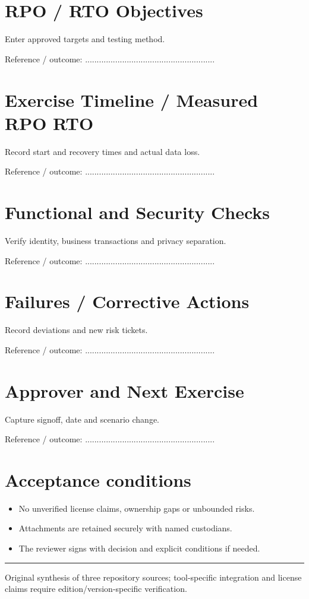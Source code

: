 \documentclass[10pt,letterpaper]{article}
\begin{document}
\section{RPO / RTO Objectives}
Enter approved targets and testing method.\par
Reference / outcome: ........................................................\par
\section{Exercise Timeline / Measured RPO RTO}
Record start and recovery times and actual data loss.\par
Reference / outcome: ........................................................\par
\section{Functional and Security Checks}
Verify identity, business transactions and privacy separation.\par
Reference / outcome: ........................................................\par
\section{Failures / Corrective Actions}
Record deviations and new risk tickets.\par
Reference / outcome: ........................................................\par
\section{Approver and Next Exercise}
Capture signoff, date and scenario change.\par
Reference / outcome: ........................................................\par
\section{Acceptance conditions}
\begin{itemize}
\item No unverified license claims, ownership gaps or unbounded risks.
\item Attachments are retained securely with named custodians.
\item The reviewer signs with decision and explicit conditions if needed.
\end{itemize}
\vfill\noindent\color{muted}\rule{\linewidth}{0.4pt}\par\scriptsize Original synthesis of three repository sources; tool-specific integration and license claims require edition/version-specific verification.\normalsize
\end{document}
